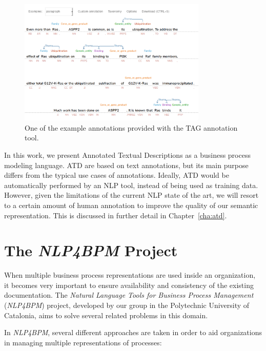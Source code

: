 \begin{figure}[htb]
  \centering
  \includegraphics[width=0.8\textwidth]{figures/tag}
  \caption{One of the example annotations provided with the TAG
    annotation tool.}
  \label{fig:tag}
\end{figure}

In this work, we present Annotated Textual Descriptions as a business process
modeling language. ATD are based on text annotations, but its main purpose
differs from the typical use cases of annotations. Ideally, ATD would be
automatically performed by an NLP tool, instead of being used as training data.
However, given the limitations of the current NLP state of the art, we will
resort to a certain amount of human annotation to improve the quality of our
semantic representation. This is discussed in further detail in Chapter~\ref{cha:atd}.

\section{The \emph{NLP4BPM} Project}
\label{sec:background_nlp4bpm}

When multiple business process representations are used inside an organization,
it becomes very important to ensure availability and consistency of the existing
documentation. The \emph{Natural Language Tools for Business Process Management}
(\emph{NLP4BPM}) project, developed by our group in the Polytechnic University
of Catalonia, aims to solve several related problems in this domain.

In \emph{NLP4BPM}, several different approaches are taken in order to aid
organizations in managing multiple representations of processes:

